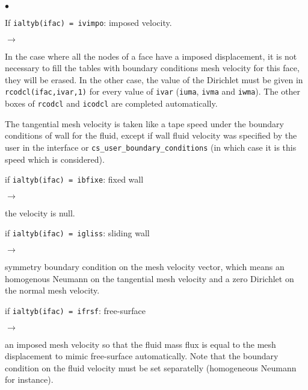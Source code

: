 {{\begin{list}{$\bullet$}{}

\item If \texttt{ialtyb(ifac) = ivimpo}: imposed velocity.

\begin{list}{$\rightarrow$}{}
\item In the case where all the nodes of a face have a imposed displacement,
 it is not necessary to fill the tables with boundary conditions
 mesh velocity for this face, they will be erased. In the other case,
 the value of the Dirichlet must be given in \texttt{rcodcl(ifac,ivar,1)} for
 every value of \texttt{ivar} (\texttt{iuma}, \texttt{ivma} and \texttt{iwma}).
 The other boxes of \texttt{rcodcl} and \texttt{icodcl} are completed automatically.

 The tangential mesh velocity is taken like a tape speed under the
 boundary conditions of wall for the fluid, except if wall fluid velocity
 was specified by the user in the interface or \texttt{cs\_user\_boundary\_conditions} (in which case
 it is this speed which is considered).
\end{list}

 \item if \texttt{ialtyb(ifac) = ibfixe}: fixed wall
\begin{list}{$\rightarrow$}{}
 \item the velocity is null.
\end{list}

 \item if \texttt{ialtyb(ifac) = igliss}: sliding wall
\begin{list}{$\rightarrow$}{}
\item symmetry boundary condition on the mesh velocity vector, which means an homogenous Neumann on the tangential mesh velocity and a zero Dirichlet on the normal mesh velocity.
\end{list}

 \item if \texttt{ialtyb(ifac) = ifrsf}: free-surface
\begin{list}{$\rightarrow$}{}
\item an imposed mesh velocity so that the fluid mass flux is equal to the mesh displacement to mimic free-surface automatically. Note that the boundary condition on the fluid velocity must be set separatelly (homogeneous Neumann for instance).
\end{list}

\end{list}
}

}
